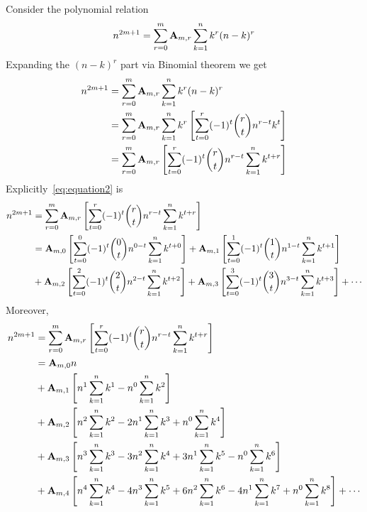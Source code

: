 Consider the polynomial relation
\begin{equation}
    n^{2m+1} = \sum_{r=0}^{m} {\mathbf{A}} \sb{m,r} \sum_{k=1}^{n} k^{r} (n-k)^{r}\label{eq:odd-power-identity}
\end{equation}
Expanding the $(n-k)^r$ part via Binomial theorem we get
\begin{equation}
    \begin{split}
        n^{2m+1} &= \sum_{r=0}^{m} {\mathbf{A}} \sb{m,r} \sum_{k=1}^{n} k^{r} (n-k)^{r} \\
        &= \sum_{r=0}^{m} {\mathbf{A}} \sb{m,r} \sum_{k=1}^{n} k^{r} \left[ \sum_{t=0}^{r} (-1)^t \binom{r}{t} n^{r-t} k^{t} \right] \\
        &= \sum_{r=0}^{m} {\mathbf{A}} \sb{m,r} \left[ \sum_{t=0}^{r} (-1)^t \binom{r}{t} n^{r-t} \sum_{k=1}^{n} k^{t+r} \right] \\
    \end{split}\label{eq:equation2}
\end{equation}
Explicitly~\eqref{eq:equation2} is
\begin{equation}
    \begin{split}
        n^{2m+1}
        &= \sum_{r=0}^{m} {\mathbf{A}} \sb{m,r} \left[ \sum_{t=0}^{r} (-1)^t \binom{r}{t} n^{r-t} \sum_{k=1}^{n} k^{t+r} \right] \\
        &= {\mathbf{A}} \sb{m,0} \left[ \sum_{t=0}^{0} (-1)^t \binom{0}{t} n^{0-t} \sum_{k=1}^{n} k^{t+0} \right]
        + {\mathbf{A}} \sb{m,1} \left[ \sum_{t=0}^{1} (-1)^t \binom{1}{t} n^{1-t} \sum_{k=1}^{n} k^{t+1} \right] \\
        &+ {\mathbf{A}} \sb{m,2} \left[ \sum_{t=0}^{2} (-1)^t \binom{2}{t} n^{2-t} \sum_{k=1}^{n} k^{t+2} \right]
        + {\mathbf{A}} \sb{m,3} \left[ \sum_{t=0}^{3} (-1)^t \binom{3}{t} n^{3-t} \sum_{k=1}^{n} k^{t+3} \right] + \cdots \\
    \end{split}\label{eq:equation13}
\end{equation}
Moreover,
\begin{equation}
    \begin{split}
        n^{2m+1}
        &= \sum_{r=0}^{m} {\mathbf{A}} \sb{m,r} \left[ \sum_{t=0}^{r} (-1)^t \binom{r}{t} n^{r-t} \sum_{k=1}^{n} k^{t+r} \right] \\
        &= {\mathbf{A}} \sb{m,0} n \\
        &+ {\mathbf{A}} \sb{m,1} \left[ n^{1} \sum_{k=1}^{n} k^{1} - n^{0} \sum_{k=1}^{n} k^{2} \right] \\
        &+ {\mathbf{A}} \sb{m,2} \left[ n^{2} \sum_{k=1}^{n} k^{2} - 2 n^{1} \sum_{k=1}^{n} k^{3} + n^{0} \sum_{k=1}^{n} k^{4}\right] \\
        &+ {\mathbf{A}} \sb{m,3} \left[ n^{3} \sum_{k=1}^{n} k^{3} - 3 n^{2} \sum_{k=1}^{n} k^{4} + 3 n^{1} \sum_{k=1}^{n} k^{5} - n^{0} \sum_{k=1}^{n} k^{6} \right] \\
        &+ {\mathbf{A}} \sb{m,4} \left[ n^{4} \sum_{k=1}^{n} k^{4} - 4 n^{3} \sum_{k=1}^{n} k^{5} + 6 n^{2} \sum_{k=1}^{n} k^{6} - 4 n^{1} \sum_{k=1}^{n} k^{7} + n^{0} \sum_{k=1}^{n} k^{8} \right] + \cdots \\
    \end{split}\label{eq:equation14}
\end{equation}
